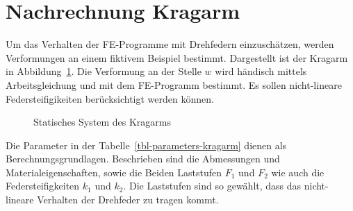 \documentclass[
  12pt,
  letterpaper,
  egregdoesnotlikesansseriftitles]{scrreprt}
\begin{document}
\section{Nachrechnung Kragarm}\label{nachrechnung-kragarm}

Um das Verhalten der FE-Programme mit Drehfedern einzuschätzen, werden
Verformungen an einem fiktivem Beispiel bestimmt. Dargestellt ist der
Kragarm in Abbildung~\ref{fig-kragarm-feder}. Die Verformung an der
Stelle \(w\) wird händisch mittels Arbeitsgleichung und mit dem
FE-Programm bestimmt. Es sollen nicht-lineare Federsteifigikeiten
berücksichtigt werden können.

\begin{figure}[H]


\caption{\label{fig-kragarm-feder}Statisches System des Kragarms}

\end{figure}%

Die Parameter in der Tabelle~\ref{tbl-parameters-kragarm} dienen als
Berechnungsgrundlagen. Beschrieben sind die Abmessungen und
Materialeigenschaften, sowie die Beiden Laststufen \(F_1\) und \(F_2\)
wie auch die Federsteifigkeiten \(k_1\) und \(k_2\). Die Laststufen sind
so gewählt, dass das nicht-lineare Verhalten der Drehfeder zu tragen
kommt.
\end{document}
